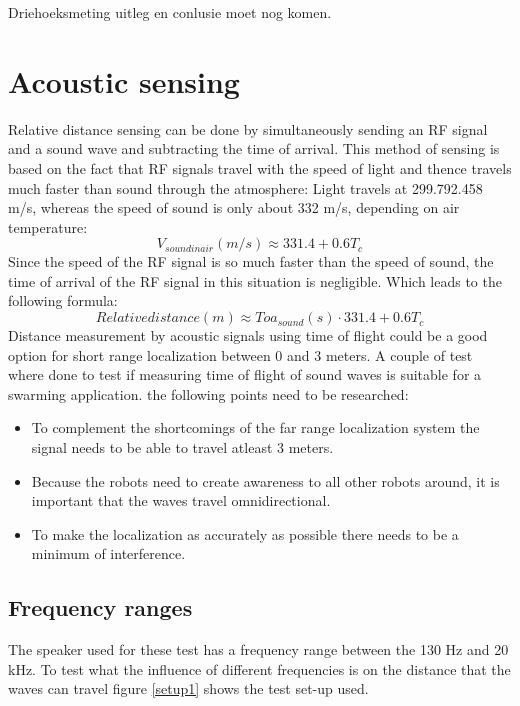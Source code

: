 \documentclass[10pt,a4paper]{article}
\begin{document}
Driehoeksmeting uitleg en conlusie moet nog komen.

\newpage

\section{Acoustic sensing}

Relative distance sensing can be done by simultaneously sending an RF signal and a sound wave and subtracting the time of arrival.
This method of sensing is based on the fact that RF signals travel with the speed of light and thence travels much faster than sound through the atmosphere: Light travels at 299.792.458 m/s, whereas the speed of sound is only about 332 m/s, depending on air temperature:
\begin{equation}
\label{eq:speedsoundinair}
V_{sound in air}(m/s)\approx 331.4+0.6T_{c}
\end{equation}
Since the speed of the RF signal is so much faster than the speed of sound, the time of arrival of the RF signal in this situation is negligible. Which leads to the following formula:
\begin{equation}
Relative distance(m) \approx Toa_{sound}(s)\cdot  331.4+0.6T_{c}
\end{equation}
Distance measurement by acoustic signals using time of flight could be a good option for short range localization between 0 and 3 meters. A couple of test where done to test if measuring time of flight of sound waves is suitable for a swarming application. the following points need to be researched:
\begin{itemize}
\item To complement the shortcomings of the far range localization system the signal needs to be able to travel atleast 3 meters.
\item Because the robots need to create awareness to all other robots around, it is important that the waves travel omnidirectional. 
\item To make the localization as accurately as possible there needs to be a minimum of interference. 
\end{itemize}

\subsection{Frequency ranges}
The speaker used for these test has a frequency range between the 130 Hz and 20 kHz. To test what the influence of different frequencies is on the distance that the waves can travel figure \ref{setup1} shows the test set-up used.
\end{document}
